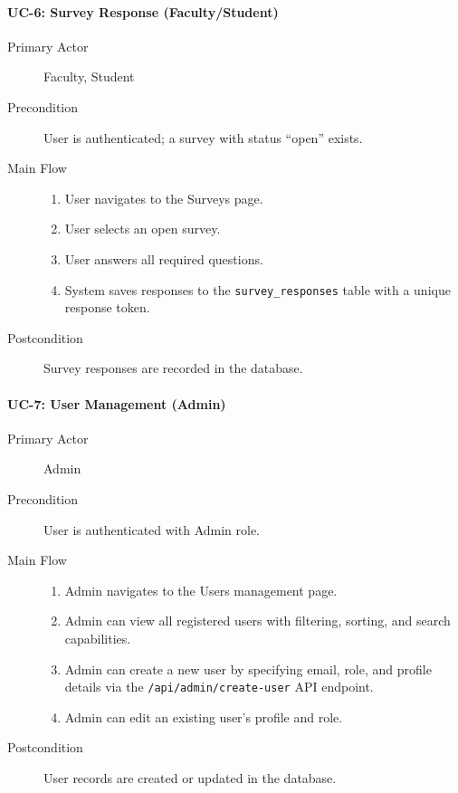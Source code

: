 \documentclass[11pt,a4paper]{article}
\begin{document}
\paragraph{UC-6: Survey Response (Faculty/Student)}
\begin{description}
  \item[Primary Actor] Faculty, Student
  \item[Precondition] User is authenticated; a survey with status ``open'' exists.
  \item[Main Flow]
    \begin{enumerate}[leftmargin=1.5em]
      \item User navigates to the Surveys page.
      \item User selects an open survey.
      \item User answers all required questions.
      \item System saves responses to the \texttt{survey\_responses} table with a unique response token.
    \end{enumerate}
  \item[Postcondition] Survey responses are recorded in the database.
\end{description}

\paragraph{UC-7: User Management (Admin)}
\begin{description}
  \item[Primary Actor] Admin
  \item[Precondition] User is authenticated with Admin role.
  \item[Main Flow]
    \begin{enumerate}[leftmargin=1.5em]
      \item Admin navigates to the Users management page.
      \item Admin can view all registered users with filtering, sorting, and search capabilities.
      \item Admin can create a new user by specifying email, role, and profile details via the \texttt{/api/admin/create-user} API endpoint.
      \item Admin can edit an existing user's profile and role.
    \end{enumerate}
  \item[Postcondition] User records are created or updated in the database.
\end{description}
\end{document}
